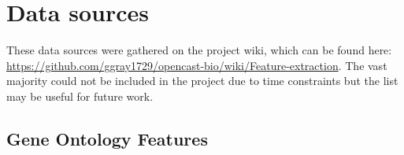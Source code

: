 \chapter{Data sources}
\label{datasources}

These data sources were gathered on the project wiki, which can be found here: \url{https://github.com/ggray1729/opencast-bio/wiki/Feature-extraction}.
The vast majority could not be included in the project due to time constraints but the list may be useful for future work.



\section{Gene Ontology Features}
\label{app:go}

